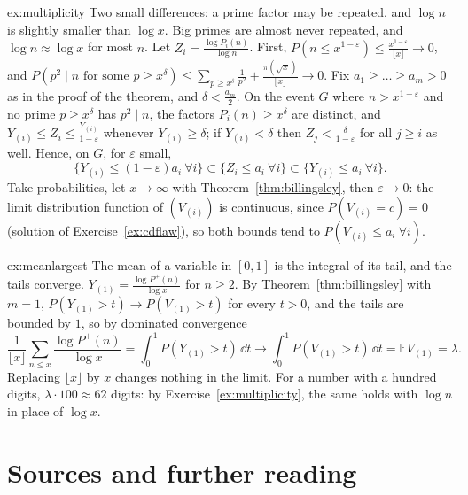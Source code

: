 \begin{solution}{ex:multiplicity}
\idea Two small differences: a prime factor may be repeated, and $\log n$ is slightly smaller than $\log x$. Big primes are almost never repeated, and $\log n\approx\log x$ for most $n$.
\writeup Let $Z_i=\frac{\log P_i(n)}{\log n}$. First, $P(n\le x^{1-\varepsilon})\le\frac{x^{1-\varepsilon}}{\lfloor x\rfloor}\to0$, and $P(p^2\mid n\text{ for some }p\ge x^\delta)\le\sum_{p\ge x^\delta}\frac1{p^2}+\frac{\pi(\sqrt x)}{\lfloor x\rfloor}\to0$. Fix $a_1\ge\dots\ge a_m>0$ as in the proof of the theorem, and $\delta<\frac{a_m}2$. On the
event $G$ where $n>x^{1-\varepsilon}$ and no prime $p\ge x^\delta$ has $p^2\mid n$, the factors $P_i(n)\ge x^\delta$ are distinct, and $Y_{(i)}\le Z_i\le\frac{Y_{(i)}}{1-\varepsilon}$ whenever $Y_{(i)}\ge\delta$; if $Y_{(i)}<\delta$ then $Z_j<\frac\delta{1-\varepsilon}$ for all $j\ge i$ as well. Hence, on $G$, for $\varepsilon$ small,
\[
\{Y_{(i)}\le(1-\varepsilon)a_i\ \forall i\}\subset\{Z_i\le a_i\ \forall i\}\subset\{Y_{(i)}\le a_i\ \forall i\}.
\]
Take probabilities, let $x\to\infty$ with Theorem~\ref{thm:billingsley}, then $\varepsilon\to0$: the limit distribution function of $(V_{(i)})$ is continuous, since $P(V_{(i)}=c)=0$ (solution of Exercise~\ref{ex:cdflaw}), so both bounds tend to $P(V_{(i)}\le a_i\ \forall i)$.
\end{solution}

\begin{solution}{ex:meanlargest}
\idea The mean of a variable in $[0,1]$ is the integral of its tail, and the tails converge.
\writeup $Y_{(1)}=\frac{\log P^+(n)}{\log x}$ for $n\ge2$. By Theorem~\ref{thm:billingsley} with $m=1$, $P(Y_{(1)}>t)\to P(V_{(1)}>t)$ for every $t>0$, and the tails are bounded by $1$, so by dominated convergence
\[
\frac1{\lfloor x\rfloor}\sum_{n\le x}\frac{\log P^+(n)}{\log x}=\int_0^1P(Y_{(1)}>t)\,\dd t\longrightarrow\int_0^1P(V_{(1)}>t)\,\dd t=\mathbb EV_{(1)}=\lambda.
\]
Replacing $\lfloor x\rfloor$ by $x$ changes nothing in the limit. For a number with a hundred digits, $\lambda\cdot100\approx62$ digits: by Exercise~\ref{ex:multiplicity}, the same holds with $\log n$ in place of $\log x$.
\end{solution}

\section*{Sources and further reading}

